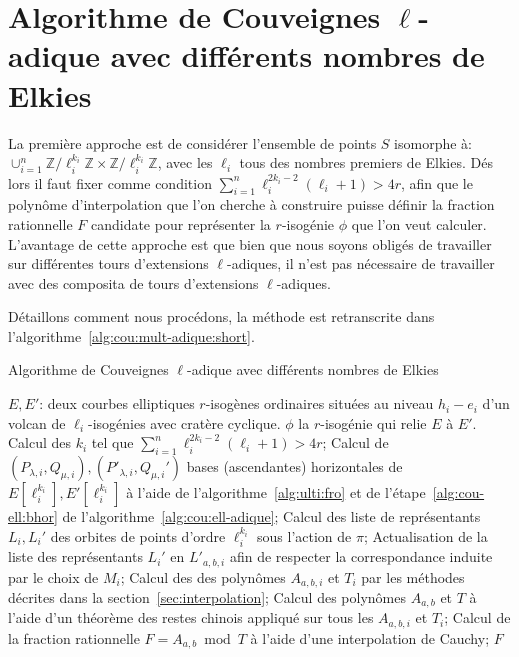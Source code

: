 \documentclass[10pt,a4paper]{book}
\theoremstyle{plain}
\theoremstyle{definition}
\theoremstyle{definition}
\theoremstyle{definition}
\theoremstyle{definition}
\theoremstyle{definition}
\theoremstyle{remark}
\theoremstyle{remark}
\theoremstyle{definition}
\begin{document}
\section{Algorithme de Couveignes $\ell$-adique avec différents nombres de Elkies}
La première approche est de considérer l'ensemble de points $S$ isomorphe à: 
$\cup_{i=1}^n \mathbb{Z}/\ell_i^{k_i} \mathbb{Z} \times \mathbb{Z}/\ell_i^{k_i} \mathbb{Z} $,
avec les $\ell_i$ tous des nombres premiers de Elkies. Dés lors il faut fixer comme 
condition  $\sum_{i=1}^n\ell_i^{2k_{i}-2}(\ell_i+1)>4r$,
afin que le polynôme d'interpolation que l'on cherche à construire puisse 
définir la fraction rationnelle $F$ candidate pour représenter la $r$-isogénie 
$\phi$ que l'on veut calculer. 
L'avantage de cette approche est que bien que nous soyons obligés de travailler
sur différentes tours d'extensions $\ell$-adiques, il n'est pas nécessaire de 
travailler avec des composita de tours d'extensions $\ell$-adiques.

Détaillons comment nous procédons, la méthode est retranscrite dans 
l'algorithme~\ref{alg:cou:mult-adique:short}. %

\begin{algorithm}
\caption{\label{alg:cou:mult-adique:short} Algorithme de Couveignes $\ell$-adique avec différents nombres de Elkies}
\begin{algorithmic}[1]
\REQUIRE $E,E'$: deux courbes elliptiques $r$-isogènes ordinaires situées au niveau $h_i-e_i$ d'un volcan de $\ell_i$-isogénies avec cratère cyclique.
\ENSURE $\phi$ la $r$-isogénie qui relie $E$ à $E'$.
\STATE Calcul des $k_i$ tel que $\sum_{i=1}^n\ell_{i}^{2k_{i}-2}(\ell_{i}+1)>4r$;
\STATE \label{alg:mult-ell:bhor} Calcul de $(P_{\lambda,i},Q_{\mu,i}),
(P'_{\lambda,i},Q_{\mu,i}')$ bases (ascendantes) horizontales de 
$E[\ell_i^{k_i}],E'[\ell_i^{k_i}]$ à l'aide de l'algorithme~\ref{alg:ulti:fro} et de l'étape~\ref{alg:cou-ell:bhor} de l'algorithme~\ref{alg:cou:ell-adique};
\STATE \label{alg:mult-ell:rep} Calcul des liste de représentants $L_i,L_i'$ des orbites de points d'ordre $\ell_i^{k_i}$ sous l'action de $\pi$;
\ENDFOR
{}
\STATE \label{alg:mult-ell:ord} Actualisation de la liste des représentants $L_i'$ en $L'_{a,b,i}$ afin de respecter la correspondance induite par le choix de $M_i$;
\STATE \label{alg:mult-ell:int} Calcul des des polynômes $A_{a,b,i}$ et $T_i$ par les méthodes décrites dans la section~\ref{sec:interpolation};
\ENDFOR
\STATE Calcul des polynômes $A_{a,b}$ et $T$ à l'aide d'un théorème des restes chinois appliqué sur tous les $A_{a,b,i}$ et $T_i$;
\STATE \label{alg:mult-ell:Cauchy} Calcul de la fraction rationnelle $F=A_{a,b} \bmod T$ à l'aide d'une interpolation de Cauchy;
\RETURN $F$
\ENDIF
\ENDFOR 
\end{algorithmic}
\end{algorithm}
\end{document}
